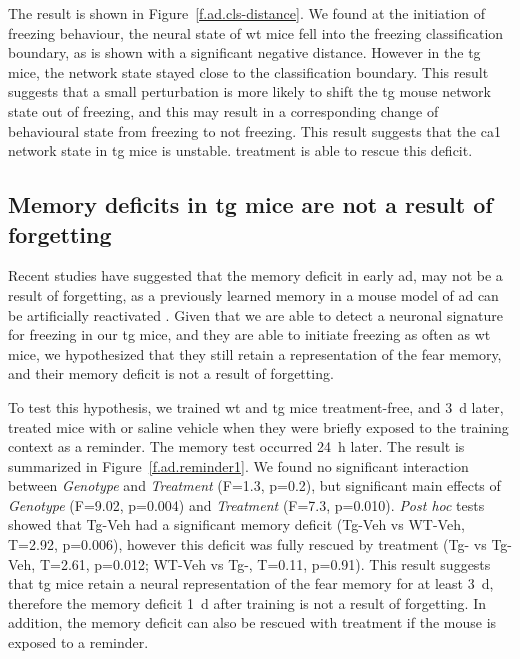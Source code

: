 The result is shown in Figure~\ref{f.ad.cls-distance}. We found at the initiation of freezing behaviour, the neural state of \gls{wt} mice fell into the freezing classification boundary, as is shown with a significant negative distance. However in the \gls{tg} mice, the network state stayed close to the classification boundary. This result suggests that a small perturbation is more likely to shift the \gls{tg} mouse network state out of freezing, and this may result in a corresponding change of behavioural state from freezing to not freezing. This result suggests that the \gls{ca1} network state in \gls{tg} mice is unstable. \tglu{} treatment is able to rescue this deficit. 

\subsection{Memory deficits in \Gls{tg} mice are not a result of forgetting}

Recent studies have suggested that the memory deficit in early \gls{ad}, may not be a result of forgetting, as a previously learned memory in a mouse model of \gls{ad} can be artificially reactivated \citep{roy16}. Given that we are able to detect a neuronal signature for freezing in our \gls{tg} mice, and they are able to initiate freezing as often as \gls{wt} mice, we hypothesized that they still retain a representation of the fear memory, and their memory deficit is not a result of forgetting.

To test this hypothesis, we trained \gls{wt} and \gls{tg} mice treatment-free, and \SI{3}{\day} later, treated mice with \tglu{} or saline vehicle when they were briefly exposed to the training context as a reminder. The memory test occurred \SI{24}{\hour} later. The result is summarized in Figure~\ref{f.ad.reminder1}. We found no significant interaction between \textit{Genotype} and \textit{Treatment} (F=1.3, p=0.2), but significant main effects of \textit{Genotype} (F=9.02, p=0.004) and \textit{Treatment} (F=7.3, p=0.010). \textit{Post hoc} tests showed that Tg-Veh had a significant memory deficit (Tg-Veh vs WT-Veh, T=2.92, p=0.006), however this deficit was fully rescued by \tglu{} treatment (Tg-\glu{} vs Tg-Veh, T=2.61, p=0.012; WT-Veh vs Tg-\glu{}, T=0.11, p=0.91). This result suggests that \gls{tg} mice retain a neural representation of the fear memory for at least \SI{3}{\day}, therefore the memory deficit \SI{1}{\day} after training is not a result of forgetting. In addition, the memory deficit can also be rescued with \tglu{} treatment if the mouse is exposed to a reminder.

